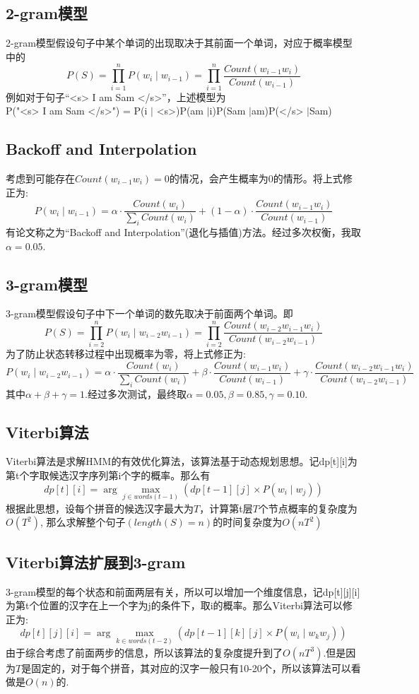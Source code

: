 \documentclass[UTF8, onecolumn, a4paper]{article}
\begin{document}
\subsection{2-gram模型}
2-gram模型假设句子中某个单词的出现取决于其前面一个单词，对应于概率模型中的
$$P(S) = \prod_{i=1}^{n}P(w_i\mid w_{i-1}) = \prod_{i=1}^{n}\frac{Count(w_{i-1}w_i)}{Count(w_{i-1})}$$
例如对于句子“<s> I am Sam </s>”，上述模型为\\
P("<s> I am Sam </s>") = P(i $\mid$ <s>)P(am $\mid$i)P(Sam $\mid$am)P(</s> $\mid$Sam)
\subsection{Backoff and Interpolation}
考虑到可能存在$Count(w_{i-1}w_i) = 0$的情况，会产生概率为0的情形。将上式修正为:
$$P(w_i\mid w_{i-1}) = \alpha \cdot\frac{Count(w_i)}{\sum_{i}Count(w_i)} + (1-\alpha)\cdot \frac{Count(w_{i-1}w_i)}{Count(w_{i-1})}$$
有论文称之为“Backoff and Interpolation”(退化与插值)方法。经过多次权衡，我取$\alpha = 0.05$.
\subsection{3-gram模型}
3-gram模型假设句子中下一个单词的数先取决于前面两个单词。即
$$P(S) = \prod_{i=2}^{n}P(w_i\mid w_{i-2}w_{i-1}) = \prod_{i=2}^{n}\frac{Count(w_{i-2}w_{i-1}w_i)}{Count(w_{i-2}w_{i-1})}$$
为了防止状态转移过程中出现概率为零，将上式修正为:
$$P(w_i\mid w_{i-2}w_{i-1}) = \alpha \cdot\frac{Count(w_i)}{\sum_{i}Count(w_i)} + \beta \cdot \frac{Count(w_{i-1}w_i)}{Count(w_{i-1})} + \gamma\cdot \frac{Count(w_{i-2}w_{i-1}w_i)}{Count(w_{i-2}w_{i-1})}$$
其中$\alpha + \beta + \gamma = 1$.经过多次测试，最终取$\alpha = 0.05, \beta = 0.85, \gamma = 0.10$.
\subsection{Viterbi算法}
Viterbi算法是求解HMM的有效优化算法，该算法基于动态规划思想。记dp[t][i]为第t个字取候选汉字序列第i个字的概率。那么有$$dp[t][i] = \arg\max_{j\in words(t-1)} \left(dp[t-1][j]\times P(w_i\mid w_j)\right)$$
根据此思想，设每个拼音的候选汉字最大为$T$，计算第t层$T$个节点概率的复杂度为$O(T^2)$, 那么求解整个句子$(length(S) = n)$的时间复杂度为$O(nT^2)$
\subsection{Viterbi算法扩展到3-gram}
3-gram模型的每个状态和前面两层有关，所以可以增加一个维度信息，记dp[t][j][i]为第t个位置的汉字在上一个字为j的条件下，取i的概率。那么Viterbi算法可以修正为:
$$dp[t][j][i] = \arg\max_{k\in words(t-2)}\left(dp[t-1][k][j]\times P(w_i\mid w_kw_j)\right)$$
由于综合考虑了前面两步的信息，所以该算法的复杂度提升到了$O(nT^3)$.但是因为$T$是固定的，对于每个拼音，其对应的汉字一般只有10-20个，所以该算法可以看做是$O(n)$的.
\end{document}
